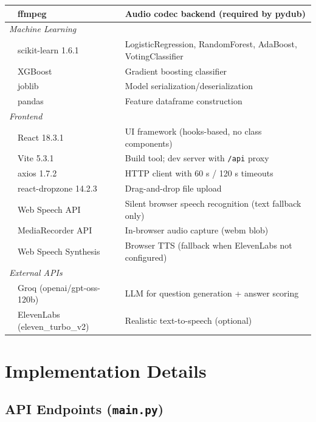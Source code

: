 \documentclass[12pt,a4paper]{article}
\begin{document}
\begin{table}[H]
\begin{tabularx}{\textwidth}{l l X}
& ffmpeg & Audio codec backend (required by pydub) \\
\midrule
\multicolumn{3}{l}{\textit{Machine Learning}} \\
& scikit-learn 1.6.1 & LogisticRegression, RandomForest, AdaBoost, VotingClassifier \\
& XGBoost & Gradient boosting classifier \\
& joblib & Model serialization/deserialization \\
& pandas & Feature dataframe construction \\
\midrule
\multicolumn{3}{l}{\textit{Frontend}} \\
& React 18.3.1 & UI framework (hooks-based, no class components) \\
& Vite 5.3.1 & Build tool; dev server with \texttt{/api} proxy \\
& axios 1.7.2 & HTTP client with 60 s / 120 s timeouts \\
& react-dropzone 14.2.3 & Drag-and-drop file upload \\
& Web Speech API & Silent browser speech recognition (text fallback only) \\
& MediaRecorder API & In-browser audio capture (webm blob) \\
& Web Speech Synthesis & Browser TTS (fallback when ElevenLabs not configured) \\
\midrule
\multicolumn{3}{l}{\textit{External APIs}} \\
& Groq (openai/gpt-oss-120b) & LLM for question generation + answer scoring \\
& ElevenLabs (eleven\_turbo\_v2) & Realistic text-to-speech (optional) \\
\bottomrule
\end{tabularx}
\end{table}

\section{Implementation Details}

\subsection{API Endpoints (\texttt{main.py})}
\end{document}
